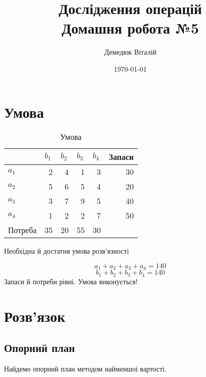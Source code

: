 \documentclass[a4paper, 12pt]{article}
\author{Демедюк Віталій}
\title{Дослідження операцій\\
	   Домашня робота №5}
\date{\today}
\begin{document}
\maketitle
\newpage

\tableofcontents

\newpage
\section{Умова}

\begin{table}[H]
  \centering
    \begin{tabular}{|l|r|r|r|r|r|}
    \hline
          & \multicolumn{1}{l|}{$b_1$} & \multicolumn{1}{l|}{$b_2$} & \multicolumn{1}{l|}{$b_3$} & \multicolumn{1}{l|}{$b_4$} & \multicolumn{1}{l|}{ Запаси} \bigstrut\\
    \hline
    $a_1$   & 2     & 4     & 1     & 3     & 30 \bigstrut\\
    \hline
    $a_2$   & 5     & 6     & 5     & 4     & 20 \bigstrut\\
    \hline
    $a_3$   & 3     & 7     & 9     & 5     & 40 \bigstrut\\
    \hline
    $a_4$   & 1     & 2     & 2     & 7     & 50 \bigstrut\\
    \hline
    Потреба & 35    & 20    & 55    & 30    &  \bigstrut\\
    \hline
    \end{tabular}%
  \label{tab:condition}%
   \caption{Умова}
\end{table}%

Необхідна й достатня умова розв'язності

\[ a_1 + a_2 + a_3 + a_ 4 = 140\]
\[ b_1 + b_2 + b_3 + b_ 4 = 140\]
Запаси й потреби рівні. Умова виконується!

\newpage
\section{Розв'язок}

\subsection{Опорний план}
Найдемо опорний план методом найменшої вартості.
\end{document}
